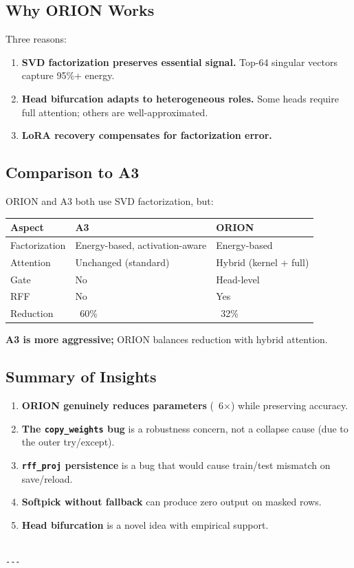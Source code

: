 \subsection{Why ORION Works}

Three reasons:

\begin{enumerate}
\item \textbf{SVD factorization preserves essential signal.} Top-64 singular
  vectors capture 95\%+ energy.
\item \textbf{Head bifurcation adapts to heterogeneous roles.} Some heads
  require full attention; others are well-approximated.
\item \textbf{LoRA recovery compensates for factorization error.}

\end{enumerate}
\subsection{Comparison to A3}

ORION and A3 both use SVD factorization, but:

\begin{table}[H]
\centering
\small
\begin{tabular}{lll}
\toprule
\textbf{Aspect} & \textbf{A3} & \textbf{ORION} \\
\midrule
Factorization & Energy-based, activation-aware & Energy-based \\
Attention & Unchanged (standard) & Hybrid (kernel + full) \\
Gate & No & Head-level \\
RFF & No & Yes \\
Reduction & ~60\% & ~32\% \\
\bottomrule
\end{tabular}
\end{table}

\textbf{A3 is more aggressive;} ORION balances reduction with hybrid attention.

\subsection{Summary of Insights}

\begin{enumerate}
\item \textbf{ORION genuinely reduces parameters} (~6$\times$) while preserving accuracy.
\item \textbf{The \texttt{copy\_weights} bug} is a robustness concern, not a collapse
  cause (due to the outer try/except).
\item \textbf{\texttt{rff\_proj} persistence} is a bug that would cause train/test
  mismatch on save/reload.
\item \textbf{Softpick without fallback} can produce zero output on masked rows.
\item \textbf{Head bifurcation} is a novel idea with empirical support.
\end{enumerate}
\begin{lstlisting}

---
\end{lstlisting}



